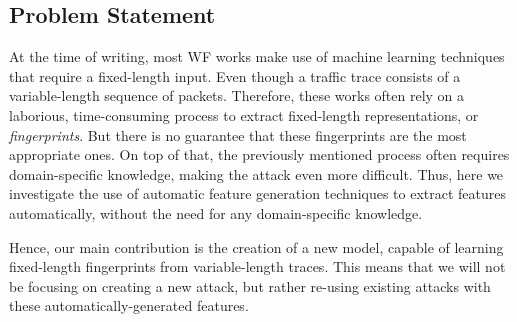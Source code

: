 \subsection{Problem Statement}

At the time of writing, most WF works make use of machine learning techniques that require a fixed-length input.
Even though a traffic trace consists of a variable-length sequence of packets.
Therefore, these works often rely on a laborious, time-consuming process to extract fixed-length representations, or \textit{fingerprints}.
But there is no guarantee that these fingerprints are the most appropriate ones.
On top of that, the previously mentioned process often requires domain-specific knowledge, making the attack even more difficult.
Thus, here we investigate the use of automatic feature generation techniques to extract features automatically, without the need for any domain-specific knowledge.

Hence, our main contribution is the creation of a new model, capable of learning fixed-length fingerprints from variable-length traces.
This means that we will not be focusing on creating a new attack, but rather re-using existing attacks with these automatically-generated features.
